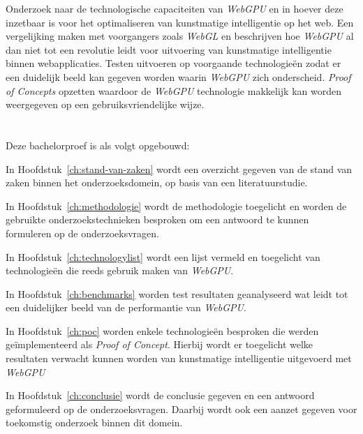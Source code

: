 
Onderzoek naar de technologische capaciteiten van \textit{WebGPU} en in hoever deze inzetbaar is voor het optimaliseren van kunstmatige intelligentie op het web. Een vergelijking maken met voorgangers zoals \textit{WebGL} en beschrijven hoe \textit{WebGPU} al dan niet tot een revolutie leidt voor uitvoering van kunstmatige intelligentie binnen web\-app\-li\-ca\-ties. Testen uitvoeren op voorgaande technologieën zodat er een duidelijk beeld kan gegeven worden waarin \textit{WebGPU} zich onderscheid. \textit{Proof of Concepts} opzetten waardoor de \textit{WebGPU} technologie makkelijk kan worden weergegeven op een gebruiksvriendelijke wijze.

\break{}

\section{}%
\label{sec:opzet-bachelorproef}


Deze bachelorproef is als volgt opgebouwd:

\bigbreak{}

In Hoofdstuk~\ref{ch:stand-van-zaken} wordt een overzicht gegeven van de stand van zaken binnen het onderzoeksdomein, op basis van een literatuurstudie.

\bigbreak{}

In Hoofdstuk~\ref{ch:methodologie} wordt de methodologie toegelicht en worden de gebruikte onderzoekstechnieken besproken om een antwoord te kunnen formuleren op de onderzoeksvragen.

\bigbreak{}

In Hoofdstuk~\ref{ch:technologylist} wordt een lijst vermeld en toegelicht van technologieën die reeds gebruik maken van \textit{WebGPU}.

\bigbreak{}

In Hoofdstuk~\ref{ch:benchmarks} worden test resultaten geanalyseerd wat leidt tot een duidelijker beeld van de performantie van \textit{WebGPU}.

\bigbreak{}

In Hoofdstuk~\ref{ch:poc} worden enkele technologieën besproken die werden geïmplementeerd als \textit{Proof of Concept}. Hierbij wordt er toegelicht welke resultaten verwacht kunnen worden van kunstmatige intelligentie uitgevoerd met \textit{WebGPU}

\bigbreak{}

In Hoofdstuk~\ref{ch:conclusie} wordt de conclusie gegeven en een antwoord geformuleerd op de onderzoeksvragen. Daarbij wordt ook een aanzet gegeven voor toekomstig onderzoek binnen dit domein.